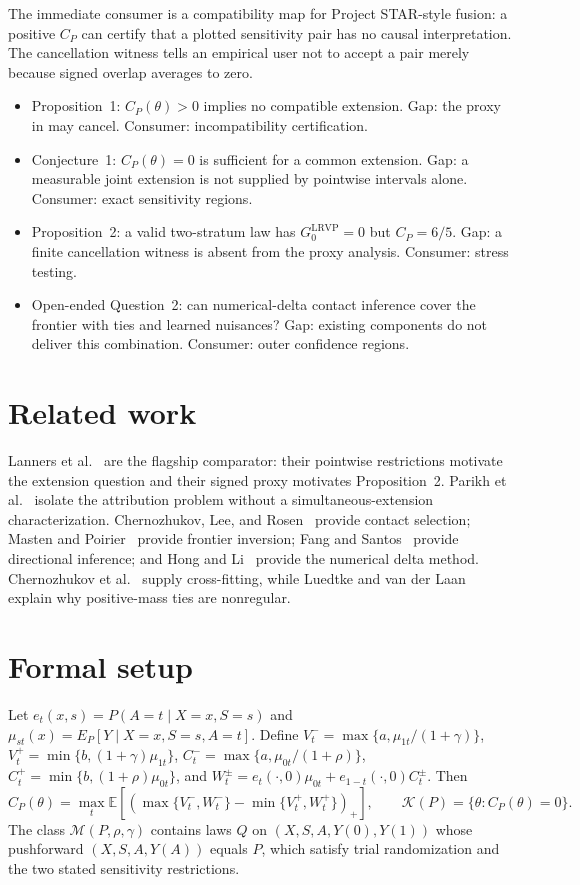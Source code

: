 \documentclass[11pt]{article}
\newcommand{\E}{\mathbb{E}}
\theoremstyle{definition}
\theoremstyle{plain}
\theoremstyle{remark}
\begin{document}
The immediate consumer is a compatibility map for Project STAR-style fusion: a positive $C_P$ can certify that a plotted sensitivity pair has no causal interpretation.  The cancellation witness tells an empirical user not to accept a pair merely because signed overlap averages to zero.

\begin{itemize}[leftmargin=*]
\item Proposition~1: $C_P(\theta)>0$ implies no compatible extension.  Gap: the proxy in \citep{LannersRudinVolfovskyParikh2025} may cancel.  Consumer: incompatibility certification.
\item Conjecture~1: $C_P(\theta)=0$ is sufficient for a common extension.  Gap: a measurable joint extension is not supplied by pointwise intervals alone.  Consumer: exact sensitivity regions.
\item Proposition~2: a valid two-stratum law has $G_0^{\mathrm{LRVP}}=0$ but $C_P=6/5$.  Gap: a finite cancellation witness is absent from the proxy analysis.  Consumer: stress testing.
\item Open-ended Question~2: can numerical-delta contact inference cover the frontier with ties and learned nuisances?  Gap: existing components do not deliver this combination.  Consumer: outer confidence regions.
\end{itemize}

\section{Related work}
Lanners et al.~\citep{LannersRudinVolfovskyParikh2025} are the flagship comparator: their pointwise restrictions motivate the extension question and their signed proxy motivates Proposition~2.  Parikh et al.~\citep{ParikhMorucciOrlandiRoyRudinVolfovsky2023} isolate the attribution problem without a simultaneous-extension characterization.  Chernozhukov, Lee, and Rosen~\citep{ChernozhukovLeeRosen2013} provide contact selection; Masten and Poirier~\citep{MastenPoirier2020} provide frontier inversion; Fang and Santos~\citep{FangSantos2019} provide directional inference; and Hong and Li~\citep{HongLi2018} provide the numerical delta method.  Chernozhukov et al.~\citep{ChernozhukovEtAl2018DML} supply cross-fitting, while Luedtke and van der Laan~\citep{LuedtkeVanderLaan2016} explain why positive-mass ties are nonregular.

\section{Formal setup}
Let $e_t(x,s)=P(A=t\mid X=x,S=s)$ and $\mu_{st}(x)=E_P[Y\mid X=x,S=s,A=t]$.  Define $V_t^- =\max\{a,\mu_{1t}/(1+\gamma)\}$, $V_t^+=\min\{b,(1+\gamma)\mu_{1t}\}$, $C_t^-=\max\{a,\mu_{0t}/(1+\rho)\}$, $C_t^+=\min\{b,(1+\rho)\mu_{0t}\}$, and $W_t^\pm=e_t(\cdot,0)\mu_{0t}+e_{1-t}(\cdot,0)C_t^\pm$.  Then
\[
C_P(\theta)=\max_t\E\left[\left(\max\{V_t^-,W_t^-\}-\min\{V_t^+,W_t^+\}\right)_+\right],\qquad \mathcal K(P)=\{\theta:C_P(\theta)=0\}.
\]
The class $\mathcal M(P,\rho,\gamma)$ contains laws $Q$ on $(X,S,A,Y(0),Y(1))$ whose pushforward $(X,S,A,Y(A))$ equals $P$, which satisfy trial randomization and the two stated sensitivity restrictions.
\end{document}
